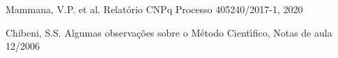 \documentclass[
12pt,		%
openright,	%
twoside,  %
a4paper,			%
chapter=TITLE,		%
english,			%
french,				%
spanish,			%
brazil				%
]{USPSC-classe/USPSC}
\begin{document}
\begin{flushleft}
\begin{flushleft}
\begin{flushleft}
\begin{flushleft}
\begin{flushleft}
\begin{flushleft}
\begin{flushleft}
\begin{flushleft}
\begin{flushleft}
\begin{flushleft}
[CNPq, 2020] Mammana, V.P. et al. Relat\'orio CNPq Processo 405240/2017-1, 2020
\end{flushleft}


\end{flushleft}


\end{flushleft}


\end{flushleft}


\end{flushleft}


\end{flushleft}


\end{flushleft}


\end{flushleft}


\end{flushleft}


\end{flushleft}


\begin{flushleft}
\begin{flushleft}
\begin{flushleft}
\begin{flushleft}
\begin{flushleft}
\begin{flushleft}
\begin{flushleft}
\begin{flushleft}
\begin{flushleft}
\begin{flushleft}
[CHIBENI, 2006] Chibeni, S.S. Algumas observa\c{c}\~oes sobre o M\'etodo Cient\'{\i}fico, Notas de aula 12/2006
\end{flushleft}


\end{flushleft}


\end{flushleft}


\end{flushleft}


\end{flushleft}


\end{flushleft}


\end{flushleft}


\end{flushleft}


\end{flushleft}


\end{flushleft}
\end{document}

